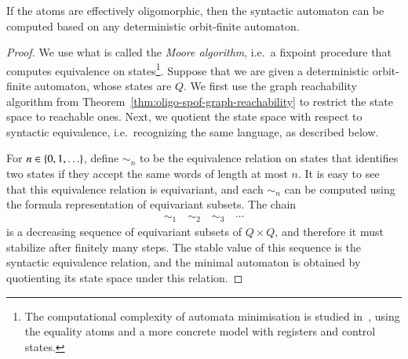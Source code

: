 \begin{theorem}\label{thm:compute-minimal}
	If the atoms are effectively oligomorphic, then the syntactic automaton can be computed based on any deterministic orbit-finite automaton.
\end{theorem}
\begin{proof}
	We use what is called the \emph{Moore algorithm}, i.e.~a fixpoint procedure that computes equivalence on states\footnote{The computational complexity of automata minimisation is studied in~\cite{DBLP:conf/lics/MurawskiRT15}, using the equality atoms and a more concrete model with registers and control states. }. Suppose that we are given a deterministic orbit-finite automaton, whose  states  are $Q$. We first use the graph reachability algorithm from Theorem~\ref{thm:oligo-spof-graph-reachability} to restrict the state space to reachable ones. Next, we quotient the state space with respect to syntactic equivalence, i.e.~recognizing the same language, as described below.

	For $n \in \{0,1,\ldots\}$, define $\sim_n$ to be the equivalence relation  on states that identifies two states if they accept the same words of length at most $n$. It is easy to see that this equivalence relation is equivariant, and each $\sim_n$ can be computed using the formula representation of equivariant subsets. The chain 
	\begin{align*}
	\sim_1 \quad \sim_2 \quad \sim_3 \quad \cdots
	\end{align*}
	is a decreasing sequence of equivariant subsets of $Q \times Q$, and therefore it must stabilize after finitely many steps. The stable value of this sequence is the syntactic equivalence relation, and the minimal automaton is obtained by quotienting its state space under this relation.
\end{proof}




\newcommand{\afin}{A_{\mathrm{fin}}}
\newcommand{\qfin}{Q_{\mathrm{fin}}}




\exercisepart





